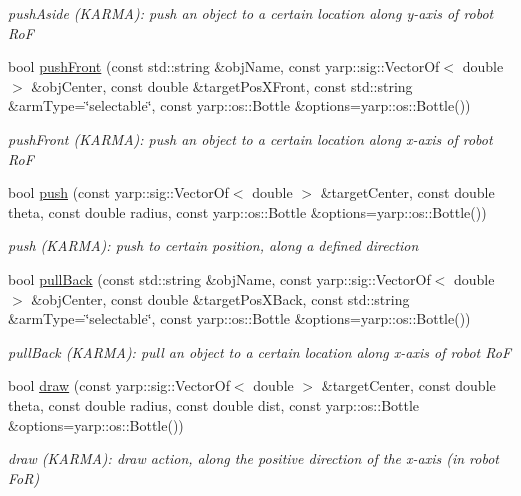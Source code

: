 \begin{DoxyCompactItemize}
\begin{DoxyCompactList}\small\item\em push\+Aside (K\+A\+R\+MA)\+: push an object to a certain location along y-\/axis of robot RoF \end{DoxyCompactList}\item 
bool \hyperlink{group__icubclient__subsystems_ac7835e392d76249294d19c863f88e679}{push\+Front} (const std\+::string \&obj\+Name, const yarp\+::sig\+::\+Vector\+Of$<$ double $>$ \&obj\+Center, const double \&target\+Pos\+X\+Front, const std\+::string \&arm\+Type=\char`\"{}selectable\char`\"{}, const yarp\+::os\+::\+Bottle \&options=yarp\+::os\+::\+Bottle())
\begin{DoxyCompactList}\small\item\em push\+Front (K\+A\+R\+MA)\+: push an object to a certain location along x-\/axis of robot RoF \end{DoxyCompactList}\item 
bool \hyperlink{group__icubclient__subsystems_aabe8749ad0593a522e8377477d7d3d9b}{push} (const yarp\+::sig\+::\+Vector\+Of$<$ double $>$ \&target\+Center, const double theta, const double radius, const yarp\+::os\+::\+Bottle \&options=yarp\+::os\+::\+Bottle())
\begin{DoxyCompactList}\small\item\em push (K\+A\+R\+MA)\+: push to certain position, along a defined direction \end{DoxyCompactList}\item 
bool \hyperlink{group__icubclient__subsystems_a956b5bad90e96ca0c2c8f33f306256ac}{pull\+Back} (const std\+::string \&obj\+Name, const yarp\+::sig\+::\+Vector\+Of$<$ double $>$ \&obj\+Center, const double \&target\+Pos\+X\+Back, const std\+::string \&arm\+Type=\char`\"{}selectable\char`\"{}, const yarp\+::os\+::\+Bottle \&options=yarp\+::os\+::\+Bottle())
\begin{DoxyCompactList}\small\item\em pull\+Back (K\+A\+R\+MA)\+: pull an object to a certain location along x-\/axis of robot RoF \end{DoxyCompactList}\item 
bool \hyperlink{group__icubclient__subsystems_a328d7187887b653399ccc783be8fb56e}{draw} (const yarp\+::sig\+::\+Vector\+Of$<$ double $>$ \&target\+Center, const double theta, const double radius, const double dist, const yarp\+::os\+::\+Bottle \&options=yarp\+::os\+::\+Bottle())
\begin{DoxyCompactList}\small\item\em draw (K\+A\+R\+MA)\+: draw action, along the positive direction of the x-\/axis (in robot FoR) \end{DoxyCompactList}\item 

\end{DoxyCompactItemize}
